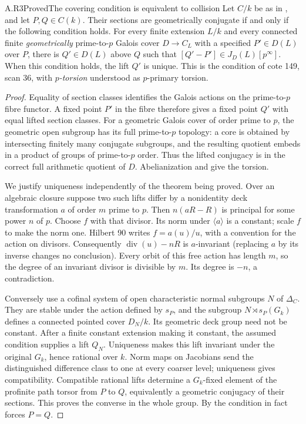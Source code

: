 \begin{claim}{A.R3}{Proved}{The covering condition is equivalent to collision}
Let $C/k$ be as in , and let $P,Q\in C(k)$.
Their sections are geometrically conjugate if and only if the
following condition holds. For every finite extension $L/k$ and every
connected finite \emph{geometrically} prime-to-$p$ Galois cover
$D\to C_L$ with a specified $P'\in D(L)$ over $P$, there is
$Q'\in D(L)$ above $Q$ such that
$[Q'-P']\in J_D(L)[p^\infty]$. When this condition holds, the lift
$Q'$ is unique. This is the condition of cote 149, scan 36, with
\emph{$p$-torsion} understood as $p$-primary torsion.
\end{claim}
\begin{proof}
Equality of section classes identifies the Galois actions on the
prime-to-$p$ fibre functor. A fixed point $P'$ in the fibre therefore
gives a fixed point $Q'$ with equal lifted section classes. For a
geometric Galois cover of order prime to $p$, the geometric open
subgroup has its full prime-to-$p$ topology: a core is obtained by
intersecting finitely many conjugate subgroups, and the resulting
quotient embeds in a product of groups of prime-to-$p$ order.
Thus the lifted conjugacy is in the correct full arithmetic quotient
of $D$. Abelianization and  give the torsion.

We justify uniqueness independently of the theorem being proved.
Over an algebraic closure suppose two such lifts differ by a
nonidentity deck transformation $a$ of order $m$ prime to $p$.
Then $n(aR-R)$ is principal for some power $n$ of $p$. Choose $f$
with that divisor. Its norm under $\langle a\rangle$ is a constant;
scale $f$ to make the norm one. Hilbert 90 writes
$f=a(u)/u$, with a convention for the action on divisors.
Consequently $\operatorname{div}(u)-nR$ is $a$-invariant (replacing
$a$ by its inverse changes no conclusion). Every orbit of this free
action has length $m$, so the degree of an invariant divisor is
divisible by $m$. Its degree is $-n$, a contradiction.

Conversely use a cofinal system of open characteristic normal
subgroups $N$ of $\Delta_C$. They are stable under the action defined
by $s_P$, and the subgroup $N\rtimes s_P(G_k)$ defines a connected
pointed cover $D_N/k$. Its geometric deck group need not be constant.
After a finite constant extension making it constant, the assumed
condition supplies a lift $Q_N$. Uniqueness makes this lift invariant
under the original $G_k$, hence rational over $k$. Norm maps on
Jacobians send the distinguished difference class to one at every
coarser level; uniqueness gives compatibility. Compatible rational
lifts determine a $G_k$-fixed element of the profinite path torsor
from $P$ to $Q$, equivalently a geometric conjugacy of their sections.
This proves the converse in the whole group. By 
the condition in fact forces $P=Q$.
\end{proof}

